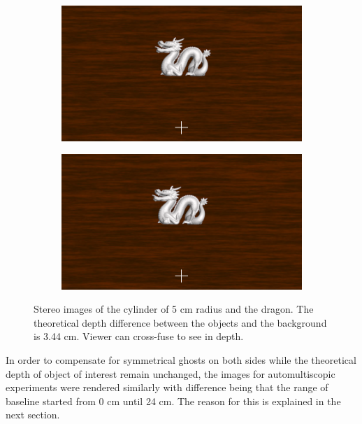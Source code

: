 \begin{figure}[htbp]
    \begin{subfigure}[b]{0.5\textwidth}
        \includegraphics[width=\textwidth]{./Template_Figures/57Ld.png}
        \caption{}\label{fig:left_stereo_dra}
    \end{subfigure}
    \begin{subfigure}[b]{0.5\textwidth}
        \includegraphics[width=\textwidth]{./Template_Figures/57Rd.png}
        \caption{}\label{fig:right_stereo_dra}
    \end{subfigure}
    \caption{Stereo images of the cylinder of 5 cm radius and the dragon. The theoretical depth difference between the objects and the background is 3.44 cm. Viewer can cross-fuse to see in depth.\label{fig:stimuli_stereo}}
\end{figure}

In order to compensate for symmetrical ghosts on both sides while the theoretical depth of object of interest remain unchanged, the images for automultiscopic experiments were rendered similarly with difference being that the range of baseline started from 0 cm until 24 cm. The reason for this is explained in the next section.

